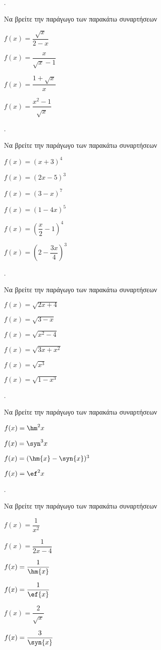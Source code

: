 \documentclass[11pt,a4paper,twocolumn]{article}
\newcounter{askhsh}
\newcommand{\askhsh}{{\large\theaskhsh.}\ \addtocounter{askhsh}{1}}
\begin{document}
\askhsh Να βρείτε την παράγωγο των παρακάτω συναρτήσεων
\begin{multicols}{2}
\begin{alist}
\item $ f(x)=\dfrac{\sqrt{x}}{2-x} $
\item $ f(x)=\dfrac{x}{\sqrt{x}-1} $
\item $ f(x)=\dfrac{1+\sqrt{x}}{x} $
\item $ f(x)=\dfrac{x^2-1}{\sqrt{x}} $
\end{alist}
\end{multicols}
\askhsh Να βρείτε την παράγωγο των παρακάτω συναρτήσεων
\begin{multicols}{2}
\begin{alist}
\item $ f(x)=(x+3)^4 $
\item $ f(x)=(2x-5)^3 $
\item $ f(x)=(3-x)^7 $
\item $ f(x)=(1-4x)^5 $
\item $ f(x)=\left(\dfrac{x}{2}-1\right)^4 $
\item $ f(x)=\left(2-\dfrac{3x}{4}\right)^3 $
\end{alist}
\end{multicols}
\askhsh Να βρείτε την παράγωγο των παρακάτω συναρτήσεων
\begin{multicols}{2}
\begin{alist}
\item $ f(x)=\sqrt{2x+4} $
\item $ f(x)=\sqrt{3-x} $
\item $ f(x)=\sqrt{x^2-4} $
\item $ f(x)=\sqrt{3x+x^2} $
\item $ f(x)=\sqrt{x^3} $
\item $ f(x)=\sqrt{1-x^3} $
\end{alist}
\end{multicols}
\askhsh Να βρείτε την παράγωγο των παρακάτω συναρτήσεων
\begin{alist}
\item $ f(x)=\hm^2{x} $
\item $ f(x)=\syn^3{x} $
\item $ f(x)=(\hm{x}-\syn{x})^3 $
\item $ f(x)=\ef^2{x} $
\end{alist}
\askhsh Να βρείτε την παράγωγο των παρακάτω συναρτήσεων
\begin{multicols}{2}
\begin{alist}
\item $ f(x)=\dfrac{1}{x^2} $
\item $ f(x)=\dfrac{1}{2x-4} $
\item $ f(x)=\dfrac{1}{\hm{x}} $
\item $ f(x)=\dfrac{1}{\ef{x}} $
\item $ f(x)=\dfrac{2}{\sqrt{x}} $
\item $ f(x)=\dfrac{3}{\syn{x}} $
\end{alist}
\end{multicols}
\end{document}
